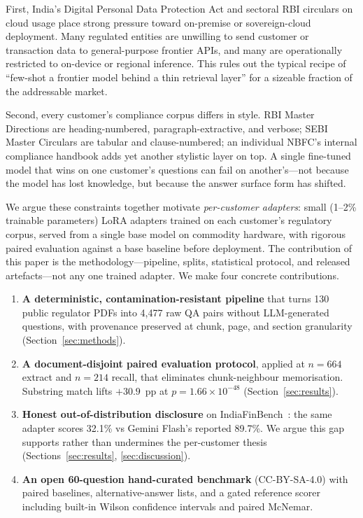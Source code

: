 \documentclass{article}
\begin{document}
First, India's Digital Personal Data Protection Act and sectoral RBI circulars on cloud usage place strong pressure toward on-premise or sovereign-cloud deployment. Many regulated entities are unwilling to send customer or transaction data to general-purpose frontier APIs, and many are operationally restricted to on-device or regional inference. This rules out the typical recipe of ``few-shot a frontier model behind a thin retrieval layer'' for a sizeable fraction of the addressable market.

Second, every customer's compliance corpus differs in style. RBI Master Directions are heading-numbered, paragraph-extractive, and verbose; SEBI Master Circulars are tabular and clause-numbered; an individual NBFC's internal compliance handbook adds yet another stylistic layer on top. A single fine-tuned model that wins on one customer's questions can fail on another's---not because the model has lost knowledge, but because the answer surface form has shifted.

We argue these constraints together motivate \emph{per-customer adapters}: small (1--2\% trainable parameters) LoRA adapters trained on each customer's regulatory corpus, served from a single base model on commodity hardware, with rigorous paired evaluation against a base baseline before deployment. The contribution of this paper is the methodology---pipeline, splits, statistical protocol, and released artefacts---not any one trained adapter. We make four concrete contributions.

\begin{enumerate}
  \item \textbf{A deterministic, contamination-resistant pipeline} that turns 130 public regulator PDFs into 4{,}477 raw QA pairs without LLM-generated questions, with provenance preserved at chunk, page, and section granularity (Section~\ref{sec:methods}).
  \item \textbf{A document-disjoint paired evaluation protocol}, applied at $n{=}664$ extract and $n{=}214$ recall, that eliminates chunk-neighbour memorisation. Substring match lifts $+30.9$~pp at $p{=}1.66\times10^{-48}$ (Section~\ref{sec:results}).
  \item \textbf{Honest out-of-distribution disclosure} on IndiaFinBench~\citep{pall2026indiafinbench}: the same adapter scores 32.1\% vs Gemini Flash's reported 89.7\%. We argue this gap supports rather than undermines the per-customer thesis (Sections~\ref{sec:results}, \ref{sec:discussion}).
  \item \textbf{An open 60-question hand-curated benchmark} (CC-BY-SA-4.0) with paired baselines, alternative-answer lists, and a gated reference scorer including built-in Wilson confidence intervals and paired McNemar.
\end{enumerate}
\end{document}
